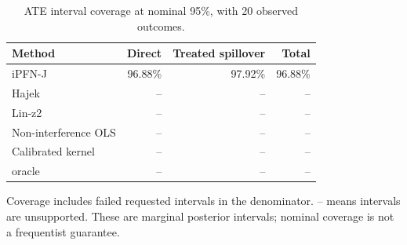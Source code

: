 \begin{table}[tb]
\centering
\caption{ATE interval coverage at nominal 95\%, with 20 observed outcomes.}
\begin{tabular}{lrrr}
\toprule
Method & Direct & Treated spillover & Total \\
\midrule
iPFN-J & 96.88\% & 97.92\% & 96.88\% \\
Hajek & -- & -- & -- \\
Lin-z2 & -- & -- & -- \\
Non-interference OLS & -- & -- & -- \\
Calibrated kernel & -- & -- & -- \\
oracle & -- & -- & -- \\
\bottomrule
\end{tabular}
\par\smallskip
\begin{minipage}{\linewidth}\scriptsize
Coverage includes failed requested intervals in the denominator. -- means intervals are unsupported.
These are marginal posterior intervals; nominal coverage is not a frequentist guarantee.
\end{minipage}
\end{table}
